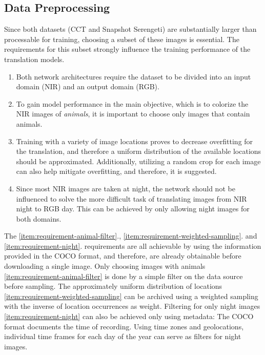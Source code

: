 \subsection{Data Preprocessing}
\label{sec:subset-generation}
Since both datasets (CCT and Snapshot Serengeti) are substantially larger than processable for training, choosing a subset of these images is essential.
The requirements for this subset strongly influence the training performance of the translation models.

\begin{enumerate}
   \item Both network architectures require the dataset to be divided into an input domain (NIR) and an output domain (RGB). \label{item:requirement-split}
   \item To gain model performance in the main objective, which is to colorize the NIR images of \textit{animals}, it is important to choose only images that contain animals. \label{item:requirement-animal-filter}
   \item Training with a variety of image locations proves to decrease overfitting for the translation, and therefore a uniform distribution of the available locations should be approximated.
         Additionally, utilizing a random crop for each image can also help mitigate overfitting, and therefore, it is suggested. \label{item:requirement-weighted-sampling}
   \item Since most NIR images are taken at night, the network should not be influenced to solve the more difficult
         task of translating images from NIR night to RGB day. This can be achieved by only allowing night images for both
         domains. \label{item:requirement-night}
\end{enumerate}


The \ref{item:requirement-animal-filter}., \ref{item:requirement-weighted-sampling}. and \ref{item:requirement-night}. requirements are all achievable by using the information provided in the COCO format, and therefore,
are already obtainable before downloading a single image.
Only choosing images with animals \ref{item:requirement-animal-filter} is done by a simple filter on the data source before sampling.
The approximately uniform distribution of locations \ref{item:requirement-weighted-sampling} can be archived using a weighted sampling with the inverse of location occurrences as weight.
Filtering for only night images \ref{item:requirement-night} can also be achieved only using metadata:
The COCO format documents the time of recording. Using time zones and geolocations, individual time frames for each day of the year can serve as filters for night images.

